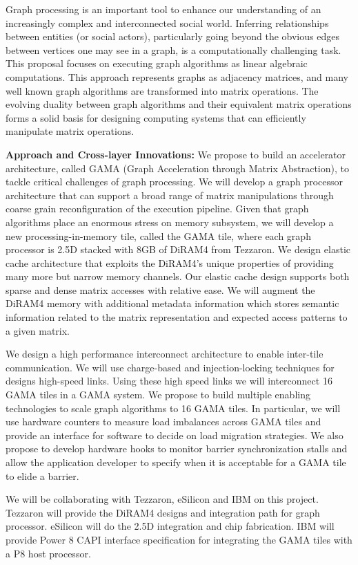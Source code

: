 \noindent
Graph processing is an important tool to enhance our understanding of an increasingly complex and interconnected social world. Inferring relationships between entities (or social actors), particularly going beyond the obvious edges between vertices one may see in a graph, is a computationally challenging task. This proposal focuses on executing graph algorithms as linear algebraic computations. This approach represents graphs as adjacency matrices, and many well known graph algorithms are transformed into matrix operations. The evolving duality between graph algorithms and their equivalent matrix operations forms a solid basis for designing computing systems that can efficiently manipulate matrix operations. 

\textbf{Approach and Cross-layer Innovations:} 
We propose to build an accelerator architecture, called GAMA (Graph Acceleration through Matrix Abstraction), to tackle critical challenges of graph processing. We will develop a graph processor architecture that can support a broad range of matrix manipulations through coarse grain reconfiguration of the execution pipeline. Given that graph algorithms place an enormous stress on memory subsystem, we will develop a new processing-in-memory tile, called the GAMA tile, where each graph processor is 2.5D stacked with 8GB of DiRAM4 from Tezzaron. We design elastic cache architecture that exploits the DiRAM4's unique properties of providing many more but narrow memory channels. Our elastic cache design supports both sparse and dense matrix accesses with relative ease. We will augment the DiRAM4 memory with additional metadata information which stores semantic information related to the matrix representation and expected access patterns to a given matrix.   

We design a high performance interconnect architecture to enable inter-tile communication. We will use  charge-based and injection-locking techniques for designs high-speed links.  Using these high speed links we will interconnect 16 GAMA tiles in a GAMA system. We propose to build multiple enabling technologies to scale graph algorithms to 16 GAMA tiles. In particular, we will use hardware counters to measure load imbalances across GAMA tiles and provide an interface for software to decide on load migration strategies. We also propose to develop hardware hooks to monitor barrier synchronization stalls and allow the application developer to specify when it is acceptable for a GAMA tile to elide a barrier. 

We will be collaborating with Tezzaron, eSilicon and IBM on this project. Tezzaron will provide the DiRAM4 designs and integration path for graph processor. eSilicon will do the 2.5D integration and chip fabrication. IBM will provide Power 8 CAPI interface specification for integrating the GAMA tiles with a P8 host processor. 

